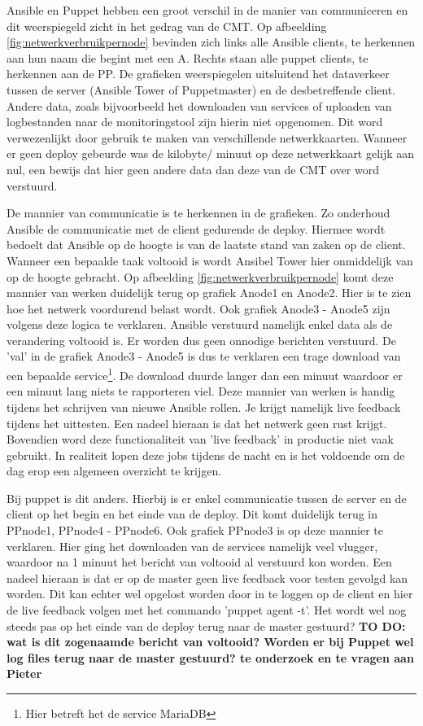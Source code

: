 Ansible en Puppet hebben een groot verschil in de manier van communiceren en dit weerspiegeld zicht in het gedrag van de CMT. Op afbeelding \ref{fig:netwerkverbruikpernode} bevinden zich links alle Ansible clients, te herkennen aan hun naam die begint met een A. Rechts staan alle puppet clients, te herkennen aan de PP. De grafieken weerspiegelen uitsluitend het dataverkeer tussen de server (Ansible Tower of Puppetmaster) en de desbetreffende client. Andere data, zoals bijvoorbeeld het downloaden van services of uploaden van logbestanden naar de monitoringstool zijn hierin niet opgenomen. Dit word verwezenlijkt door gebruik te maken van verschillende netwerkkaarten. Wanneer er geen deploy gebeurde was de kilobyte/ minuut op deze netwerkkaart gelijk aan nul, een bewijs dat hier geen andere data dan deze van de CMT over word verstuurd.  \newline

De mannier van communicatie is te herkennen in de grafieken. Zo onderhoud Ansible de communicatie met de client gedurende de deploy. Hiermee wordt bedoelt dat Ansible op de hoogte is van de laatste stand van zaken op de client. Wanneer een bepaalde taak voltooid is wordt Ansibel Tower hier onmiddelijk van op de hoogte gebracht. Op afbeelding \ref{fig:netwerkverbruikpernode} komt deze mannier van werken duidelijk terug op grafiek Anode1 en Anode2. Hier is te zien hoe het netwerk voordurend belast wordt. Ook grafiek Anode3 - Anode5 zijn volgens deze logica te verklaren. Ansible verstuurd namelijk enkel data als de verandering voltooid is. Er worden dus geen onnodige berichten verstuurd. De 'val' in de grafiek Anode3 - Anode5 is dus te verklaren een trage download van een bepaalde service\footnote{Hier betreft het de service MariaDB}. De download duurde langer dan een minuut waardoor er een minuut lang niets te rapporteren viel. Deze mannier van werken is handig tijdens het schrijven van nieuwe Ansible rollen. Je krijgt namelijk live feedback tijdens het uittesten. Een nadeel hieraan is dat het netwerk geen rust krijgt. Bovendien word deze functionaliteit van 'live feedback' in productie niet vaak gebruikt. In realiteit lopen deze jobs tijdens de nacht en is het voldoende om de dag erop een algemeen overzicht te krijgen.\newline

Bij puppet is dit anders. Hierbij is er enkel communicatie tussen de server en de client op het begin en het einde van de deploy. Dit komt duidelijk terug in PPnode1, PPnode4 - PPnode6. Ook grafiek PPnode3 is op deze mannier te verklaren. Hier ging het downloaden van de services namelijk veel vlugger, waardoor na 1 minuut het bericht van voltooid al verstuurd kon worden. Een nadeel hieraan is dat er op de master geen live feedback voor testen gevolgd kan worden. Dit kan echter wel opgelost worden door in te loggen op de client en hier de live feedback volgen met het commando 'puppet agent -t'. Het wordt wel nog steeds pas op het einde van de deploy terug naar de master gestuurd?
 \newline
\textbf{TO DO: wat is dit zogenaamde bericht van voltooid? Worden er bij Puppet wel log files terug naar de master gestuurd? te onderzoek en te vragen aan Pieter}

